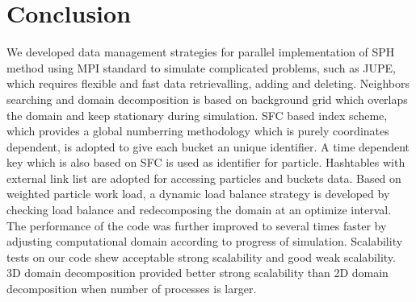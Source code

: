 \documentclass[conference,compsoc]{IEEEtran}
\begin{document}
\section{Conclusion}
We developed data management strategies for parallel implementation of SPH method using MPI standard to simulate complicated problems, such as JUPE, which requires flexible and fast data retrievalling, adding and deleting. Neighbors searching and domain decomposition is based on background grid which overlaps the domain and keep stationary during simulation. SFC based index scheme, which provides a global numberring methodology which is purely coordinates dependent, is adopted to give each bucket an unique identifier. A time dependent key which is also based on SFC is used as identifier for particle. 
Hashtables with external link list are adopted for accessing particles and buckets data. Based on weighted particle work load, a dynamic load balance strategy is developed by checking load balance and redecomposing the domain at an optimize interval. The performance of the code was further improved to several times faster by adjusting computational domain according to progress of simulation. 
Scalability tests on our code shew acceptable strong scalability and good weak scalability. 3D domain decomposition provided better strong scalability than 2D domain decomposition when number of processes is larger.
%
%

\end{document}
